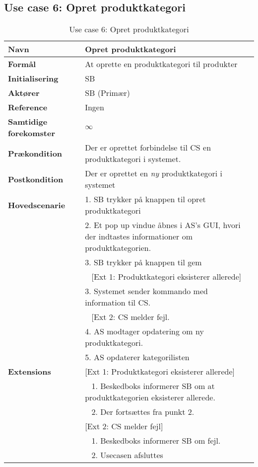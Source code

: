 \subsection{Use case 6: Opret produktkategori}


\begin{table}[H]
\begin{tabularx}{\textwidth}{|l|X|}
\hline
\textbf{Navn}					& Opret produktkategori \\\hline
\textbf{Formål}					& At oprette en produktkategori til produkter \\\hline
\textbf{Initialisering}			& \gls{SB} \\\hline
\textbf{Aktører}				& \gls{SB} (Primær)\\\hline
\textbf{Reference}				& Ingen \\\hline
								
\textbf{Samtidige forekomster}	& $\infty$ \\\hline

\textbf{Prækondition}			& Der er oprettet forbindelse til \gls{CS} en produktkategori i systemet. \\\hline

\textbf{Postkondition}			& Der er oprettet en \textit{ny} produktkategori i systemet \\\hline

\textbf{Hovedscenarie}			& 1. \gls{SB} trykker på knappen til opret produktkategori \\		
								& 2. Et pop up vindue åbnes i \gls{AS}'s \gls{GUI}, hvori der indtastes informationer om produktkategorien.\\
								& 3. \gls{SB} trykker på knappen til gem\\
								& ~ [Ext 1: Produktkategori eksisterer allerede]\\
								& 3. Systemet sender kommando med information til \gls{CS}. \\
								& ~ [Ext 2: \gls{CS} melder fejl.\\
								& 4. \gls{AS} modtager opdatering om ny produktkategori. \\
								& 5. \gls{AS} opdaterer kategorilisten \\\hline

\textbf{Extensions}				
								& [Ext 1: Produktkategori eksisterer allerede] \\	
								& ~ 1. Beskedboks informerer \gls{SB} om at produktkategorien eksisterer allerede.\\
								& ~ 2. Der fortsættes fra punkt 2.\\
								 		
								& [Ext 2: \gls{CS} melder fejl] \\
								& ~ 1. Beskedboks informerer \gls{SB} om fejl. \\
								& ~ 2. Usecasen afsluttes \\\hline
\end{tabularx}
\caption{Use case 6: Opret produktkategori}
\label{tab:UCopk}
\end{table}